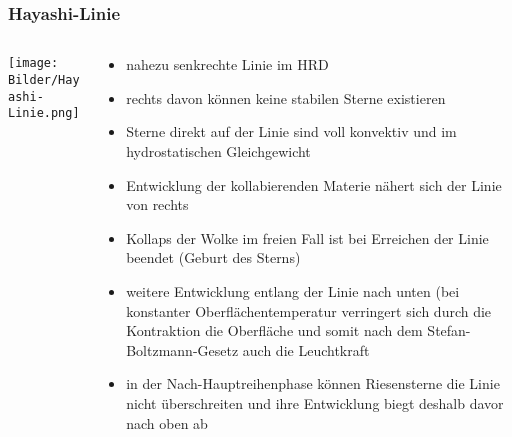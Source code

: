 \documentclass{beamer}
\begin{document}
\begin{frame}\frametitle{Hayashi-Linie}

\begin{columns}

\begin{column}{.48\textwidth}

\texttt{[image: Bilder/Hayashi-Linie.png]}

\end{column}

\hfill

\begin{column}{.48\textwidth}

\tiny

\begin{itemize}
\item nahezu senkrechte Linie im HRD
\item rechts davon können keine stabilen Sterne existieren
\item Sterne direkt auf der Linie sind voll konvektiv und im hydrostatischen Gleichgewicht
\item Entwicklung der kollabierenden Materie nähert sich der Linie von rechts
\item Kollaps der Wolke im freien Fall ist bei Erreichen der Linie beendet (Geburt des Sterns)
\item weitere Entwicklung entlang der Linie nach unten (bei konstanter Oberflächentemperatur verringert sich durch die Kontraktion die Oberfläche und somit nach dem Stefan-Boltzmann-Gesetz auch die Leuchtkraft
\item in der Nach-Hauptreihenphase können Riesensterne die Linie nicht überschreiten und ihre Entwicklung biegt deshalb davor nach oben ab
\end{itemize}

\end{column}

\end{columns}

\end{frame}
\end{document}

